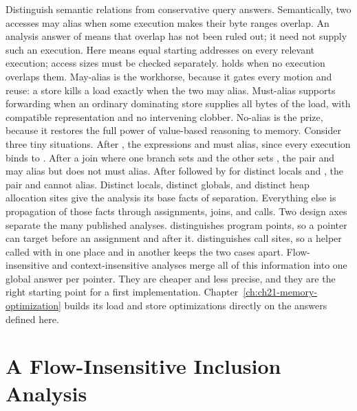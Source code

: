 Distinguish semantic relations from conservative query answers.
Semantically, two accesses may alias when some execution makes their byte ranges overlap.
An analysis answer of  means that overlap has not been ruled out; it need not supply such an execution.
Here  means equal starting addresses on every relevant execution; access sizes must be checked separately.
 holds when no execution overlaps them.
May-alias is the workhorse, because it gates every motion and reuse: a store kills a load exactly when the two may alias.
Must-alias supports forwarding when an ordinary dominating store supplies all bytes of the load, with compatible representation and no intervening clobber.
No-alias is the prize, because it restores the full power of value-based reasoning to memory.
Consider three tiny situations.
After , the expressions  and  must alias, since every execution binds  to .
After a join where one branch sets  and the other sets , the pair  and  may alias but does not must alias.
After  followed by  for distinct locals  and , the pair  and  cannot alias.
Distinct locals, distinct globals, and distinct heap allocation sites give the analysis its base facts of separation.
Everything else is propagation of those facts through assignments, joins, and calls.
Two design axes separate the many published analyses.
 distinguishes program points, so a pointer can target  before an assignment and  after it.
 distinguishes call sites, so a helper called with  in one place and  in another keeps the two cases apart.
Flow-insensitive and context-insensitive analyses merge all of this information into one global answer per pointer.
They are cheaper and less precise, and they are the right starting point for a first implementation.
Chapter~\ref{ch:ch21-memory-optimization} builds its load and store optimizations directly on the answers defined here.

\section{A Flow-Insensitive Inclusion Analysis}
\label{sec:ch20-inclusion}

